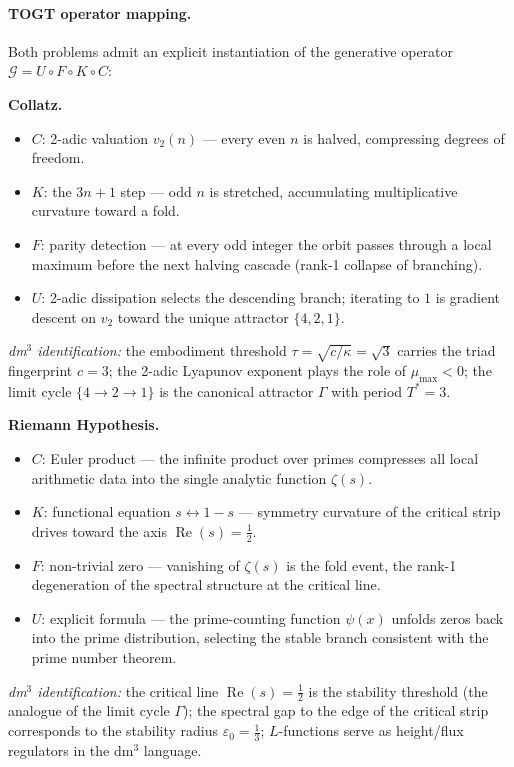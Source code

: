 \paragraph{TOGT operator mapping.}

Both problems admit an explicit instantiation of the generative operator
$\mathcal{G}=U\circ F\circ K\circ C$:

\smallskip
\noindent\textbf{Collatz.}
\begin{itemize}
  \item $C$: 2-adic valuation $v_2(n)$ — every even $n$ is halved, compressing degrees of freedom.
  \item $K$: the $3n+1$ step — odd $n$ is stretched, accumulating multiplicative curvature toward a fold.
  \item $F$: parity detection — at every odd integer the orbit passes through a local maximum before the next halving cascade (rank-1 collapse of branching).
  \item $U$: 2-adic dissipation selects the descending branch; iterating to $1$ is gradient descent on $v_2$ toward the unique attractor $\{4,2,1\}$.
\end{itemize}
\emph{dm$^3$ identification:} the embodiment threshold $\tau=\sqrt{c/\kappa}=\sqrt{3}$ carries the triad fingerprint $c=3$;
the 2-adic Lyapunov exponent plays the role of $\mu_{\max}<0$;
the limit cycle $\{4\to2\to1\}$ is the canonical attractor $\Gamma$ with period $T^*=3$.

\smallskip
\noindent\textbf{Riemann Hypothesis.}
\begin{itemize}
  \item $C$: Euler product — the infinite product over primes compresses all local arithmetic data into the single analytic function $\zeta(s)$.
  \item $K$: functional equation $s\leftrightarrow 1-s$ — symmetry curvature of the critical strip drives toward the axis $\operatorname{Re}(s)=\tfrac{1}{2}$.
  \item $F$: non-trivial zero — vanishing of $\zeta(s)$ is the fold event, the rank-1 degeneration of the spectral structure at the critical line.
  \item $U$: explicit formula — the prime-counting function $\psi(x)$ unfolds zeros back into the prime distribution, selecting the stable branch consistent with the prime number theorem.
\end{itemize}
\emph{dm$^3$ identification:} the critical line $\operatorname{Re}(s)=\tfrac{1}{2}$ is the stability threshold (the analogue of the limit cycle $\Gamma$);
the spectral gap to the edge of the critical strip corresponds to the stability radius $\varepsilon_0=\tfrac{1}{3}$;
$L$-functions serve as height/flux regulators in the dm$^3$ language.

